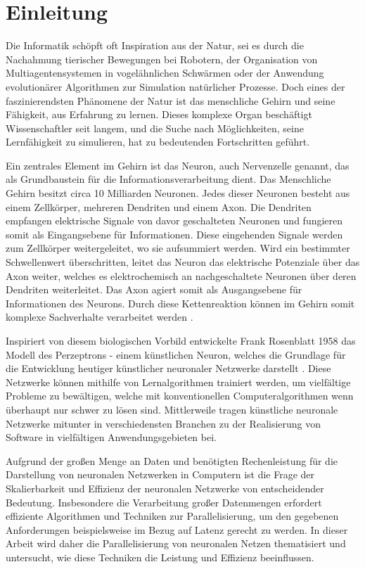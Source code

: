 \chapter{Einleitung}
\label{ch:Einleitung}

Die Informatik schöpft oft Inspiration aus der Natur, sei es durch die Nachahmung tierischer Bewegungen bei Robotern, der Organisation von Multiagentensystemen in vogelähnlichen Schwärmen oder der Anwendung evolutionärer Algorithmen zur Simulation natürlicher Prozesse. Doch eines der faszinierendsten Phänomene der Natur ist das menschliche Gehirn und seine Fähigkeit, aus Erfahrung zu lernen. Dieses komplexe Organ beschäftigt Wissenschaftler seit langem, und die Suche nach Möglichkeiten, seine Lernfähigkeit zu simulieren, hat zu bedeutenden Fortschritten geführt.

Ein zentrales Element im Gehirn ist das Neuron, auch Nervenzelle genannt, das als Grundbaustein für die Informationsverarbeitung dient. Das Menschliche Gehirn besitzt circa 10 Milliarden Neuronen. Jedes dieser Neuronen besteht aus einem Zellkörper, mehreren Dendriten und einem Axon. Die Dendriten empfangen elektrische Signale von davor geschalteten Neuronen und fungieren somit als Eingangsebene für Informationen. Diese eingehenden Signale werden zum Zellkörper weitergeleitet, wo sie aufsummiert werden. Wird ein bestimmter Schwellenwert überschritten, leitet das Neuron das elektrische Potenziale über das Axon weiter, welches es elektrochemisch an nachgeschaltete Neuronen über deren Dendriten weiterleitet. Das Axon agiert somit als Ausgangsebene für Informationen des Neurons. 
Durch diese Kettenreaktion können im Gehirn somit komplexe Sachverhalte verarbeitet werden \citep{Praktische_Einfuhrung_in_neuronale_Netze}.

Inspiriert von diesem biologischen Vorbild entwickelte Frank Rosenblatt 1958 das Modell des Perzeptrons - einem künstlichen Neuron, welches die Grundlage für die Entwicklung heutiger künstlicher neuronaler Netzwerke darstellt \citep{Rosenblatt_Perceptron}. Diese Netzwerke können mithilfe von Lernalgorithmen trainiert werden, um vielfältige Probleme zu bewältigen, welche mit konventionellen Computeralgorithmen wenn überhaupt nur schwer zu lösen sind. Mittlerweile tragen künstliche neuronale Netzwerke mitunter in verschiedensten Branchen zu der Realisierung von Software in vielfältigen Anwendungsgebieten bei.

Aufgrund der großen Menge an Daten und benötigten Rechenleistung für die Darstellung von neuronalen Netzwerken in Computern ist die Frage der Skalierbarkeit und Effizienz der neuronalen Netzwerke von entscheidender Bedeutung. Insbesondere die Verarbeitung großer Datenmengen erfordert effiziente Algorithmen und Techniken zur Parallelisierung, um den gegebenen Anforderungen beispielsweise im Bezug auf Latenz gerecht zu werden. In dieser Arbeit wird daher die Parallelisierung von neuronalen Netzen thematisiert und untersucht, wie diese Techniken die Leistung und Effizienz beeinflussen.

